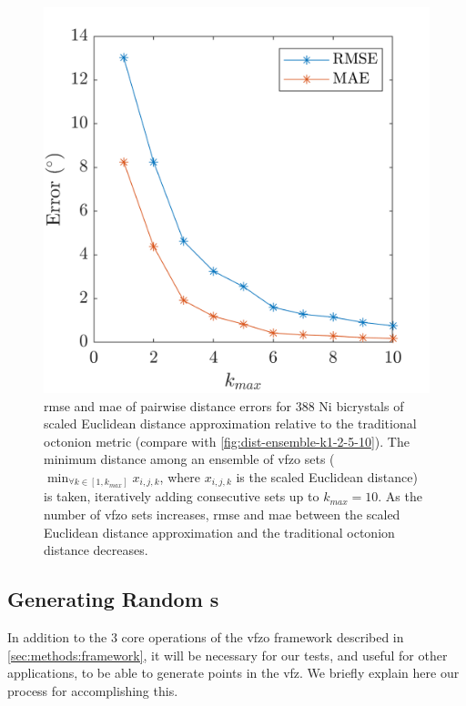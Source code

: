 \documentclass[final,twocolumn,12pt]{elsarticle}
\begin{document}
\begin{figure}
    \centering
    \includegraphics[scale=1]{figures/dist-ensemble-rmse-mae.png}
    \caption{\Gls{rmse} and \gls{mae} of pairwise distance errors for 388 Ni bicrystals \cite{olmstedSurveyComputedGrain2009a} of scaled Euclidean distance approximation relative to the traditional octonion metric \cite{chesserLearningGrainBoundary2020} (compare with \cref{fig:dist-ensemble-k1-2-5-10}). The minimum distance among an ensemble of \gls{vfzo} sets ($\min_{\forall k \in [1,k_{max}]}x_{i,j,k}$, where $x_{i,j,k}$ is the scaled Euclidean distance) is taken, iteratively adding consecutive sets up to $k_{max} = 10$. As the number of \gls{vfzo} sets increases, \gls{rmse} and \gls{mae} between the scaled Euclidean distance approximation and the traditional octonion distance decreases.}
    \label{fig:dist-ensemble-rmse-mae}
\end{figure}

\subsection{Generating Random s}
\label{sec:methods:rand}
In addition to the 3 core operations of the \gls{vfzo} framework described in \cref{sec:methods:framework}, it will be necessary for our tests, and useful for other applications, to be able to generate points in the \gls{vfz}. We briefly explain here our process for accomplishing this. 
\end{document}
